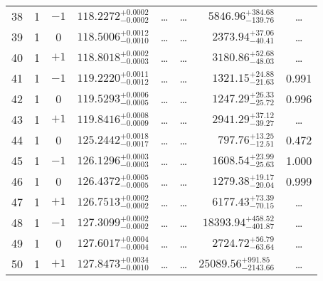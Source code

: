 \begin{table*}[!]
\begin{tabular}{llcrrlrc}
38 & 1 & $-1$ & $    118.2272_{-      0.0002}^{+      0.0002}$ & \multicolumn{1}{c}{\dots} & \multicolumn{1}{c}{\dots} & $     5846.96_{-      139.76}^{+      384.68}$ & \dots\\[1pt]
39 & 1 & 0 & $    118.5006_{-      0.0010}^{+      0.0012}$ & \multicolumn{1}{c}{\dots} & \multicolumn{1}{c}{\dots} & $     2373.94_{-       40.41}^{+       37.06}$ & \dots\\[1pt]
40 & 1 & $+1$ & $    118.8018_{-      0.0003}^{+      0.0002}$ & \multicolumn{1}{c}{\dots} & \multicolumn{1}{c}{\dots} & $     3180.86_{-       48.03}^{+       52.68}$ & \dots \\[1pt]
41 & 1 & $-1$ & $    119.2220_{-      0.0012}^{+      0.0011}$ & \multicolumn{1}{c}{\dots} & \multicolumn{1}{c}{\dots} & $     1321.15_{-       21.63}^{+       24.88}$ & 0.991\\[1pt]
42 & 1 & 0 & $    119.5293_{-      0.0005}^{+      0.0006}$ & \multicolumn{1}{c}{\dots} & \multicolumn{1}{c}{\dots} & $     1247.29_{-       25.72}^{+       26.33}$ & 0.996\\[1pt]
43 & 1 & $+1$ & $    119.8416_{-      0.0009}^{+      0.0008}$ & \multicolumn{1}{c}{\dots} & \multicolumn{1}{c}{\dots} & $     2941.29_{-       39.27}^{+       37.12}$ & \dots \\[1pt]

44 & 1 & 0 & $    125.2442_{-      0.0017}^{+      0.0018}$ & \multicolumn{1}{c}{\dots} & \multicolumn{1}{c}{\dots} & $      797.76_{-       12.51}^{+       13.25}$ & 0.472\\[1pt]
45 & 1 & $-1$ & $    126.1296_{-      0.0003}^{+      0.0003}$ & \multicolumn{1}{c}{\dots} & \multicolumn{1}{c}{\dots} & $     1608.54_{-       25.63}^{+       23.99}$ & 1.000\\[1pt]
46 & 1 & 0 & $    126.4372_{-      0.0005}^{+      0.0005}$ & \multicolumn{1}{c}{\dots} & \multicolumn{1}{c}{\dots} & $     1279.38_{-       20.04}^{+       19.17}$ & 0.999\\[1pt]
47 & 1 & $+1$ & $    126.7513_{-      0.0002}^{+      0.0002}$ & \multicolumn{1}{c}{\dots} & \multicolumn{1}{c}{\dots} & $     6177.43_{-       70.15}^{+       73.39}$ & \dots \\[1pt]
48 & 1 & $-1$ & $    127.3099_{-      0.0002}^{+      0.0002}$ & \multicolumn{1}{c}{\dots} & \multicolumn{1}{c}{\dots} & $    18393.94_{-      401.87}^{+      458.52}$ & \dots \\[1pt]
49 & 1 & 0 & $    127.6017_{-      0.0004}^{+      0.0004}$ & \multicolumn{1}{c}{\dots} & \multicolumn{1}{c}{\dots} & $     2724.72_{-       63.64}^{+       56.79}$ & \dots \\[1pt]
50 & 1 & $+1$ & $    127.8473_{-      0.0010}^{+      0.0034}$ & \multicolumn{1}{c}{\dots} & \multicolumn{1}{c}{\dots} & $    25089.56_{-     2143.66}^{+      991.85}$ & \dots \\[1pt]
\hline
\end{tabular}
\end{table*}


